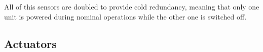 All of this sensors are doubled to provide cold redundancy, meaning that only one unit is powered during nominal operations while the other one is switched off. 


\subsection{Actuators}
\label{subsec:Actuators}
